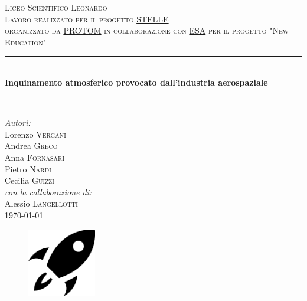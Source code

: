\documentclass[11pt]{article}
\begin{document}
\begin{titlepage}

\newcommand{\HRule}{\rule{\linewidth}{0.5mm}} %

\center

\textsc{\LARGE Liceo Scientifico Leonardo}\\[1.5cm] 
\textsc{\Large Lavoro realizzato per il progetto \href{https://www.protom.com/2021/01/20/new-education-progetti-innovativi-in-collaborazione-con-lesa-agenzia-spaziale-europea/}{STELLE}}\\[0.5cm]
\textsc{\large organizzato da \href{https://www.protom.com}{PROTOM} in collaborazione con \href{https://business.esa.int/funding/invitation-to-tender/new-education}{ESA} per il progetto "New Education"}\\[0.5cm]


\HRule \\[0.4cm]
{ \huge \bfseries Inquinamento atmosferico provocato dall'industria aerospaziale}\\[0.4cm]
\HRule \\[1.5cm]

\Large \emph{Autori:}\\
Lorenzo \textsc{Vergani}\\
\vspace{.5em}
Andrea \textsc{Greco}\\
\vspace{.5em}
Anna \textsc{Fornasari}\\
\vspace{.5em}
Pietro \textsc{Nardi}\\
\vspace{.5em}
Cecilia \textsc{Guizzi}\\
\vspace{1em}
\textit{\small con la collaborazione di:}\\
Alessio \textsc{Langellotti}\\[1cm]

{\large \today}\\[2cm]

\begin{figure}[h!]
    \centering
    \includegraphics[width=3cm]{logo.png}
    \label{logo}
\end{figure}

\vfill

\end{titlepage}
\end{document}
